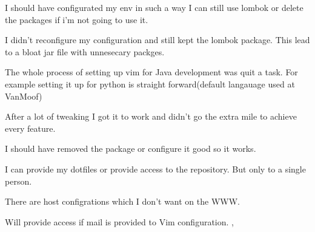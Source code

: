 {{{			I should have configurated my env in such a way I can still use lombok or delete the packages if i'm not going to use it.

		}
		{%
			I didn't reconfigure my configuration and still kept the lombok package.
			This lead to a bloat jar file with unnesecary packges.
		}
		{%
			The whole process of setting up vim for Java development was quit a task.
			For example setting it up for python is straight forward(default langauage used at VanMoof)

			After a lot of tweaking I got it to work and didn't go the extra mile to achieve every feature.

			I should have removed the package or configure it good so it works.
		}
		{
			I can provide my dotfiles or provide access to the repository.
			But only to a single person.

			There are host configrations which I don't want on the WWW.
		}
	}
	{%
		\label{bewijs:learn}
		Will provide access if mail is provided to Vim configuration.
	},
}
